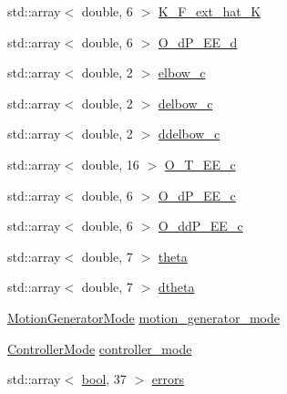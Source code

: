 \begin{DoxyCompactItemize}
\item 
std\+::array$<$ double, 6 $>$ \hyperlink{structresearch__interface_1_1robot_1_1RobotState_a0bde767e50880d3ced2dabe7b464890c}{K\+\_\+\+F\+\_\+ext\+\_\+hat\+\_\+K}
\item 
std\+::array$<$ double, 6 $>$ \hyperlink{structresearch__interface_1_1robot_1_1RobotState_aa8db400627815023275151f75b0dec35}{O\+\_\+d\+P\+\_\+\+E\+E\+\_\+d}
\item 
std\+::array$<$ double, 2 $>$ \hyperlink{structresearch__interface_1_1robot_1_1RobotState_a3ba566919f53e6f254a94d4ce0653989}{elbow\+\_\+c}
\item 
std\+::array$<$ double, 2 $>$ \hyperlink{structresearch__interface_1_1robot_1_1RobotState_a1712aac6d0214ba49004df02294d3620}{delbow\+\_\+c}
\item 
std\+::array$<$ double, 2 $>$ \hyperlink{structresearch__interface_1_1robot_1_1RobotState_abc44c8d00e4988d7238b4cc31c46364f}{ddelbow\+\_\+c}
\item 
std\+::array$<$ double, 16 $>$ \hyperlink{structresearch__interface_1_1robot_1_1RobotState_aad3e61ffb4787a8a227675ee26ab0b8f}{O\+\_\+\+T\+\_\+\+E\+E\+\_\+c}
\item 
std\+::array$<$ double, 6 $>$ \hyperlink{structresearch__interface_1_1robot_1_1RobotState_a79a43551761a4847e2e96385ecb3a5c8}{O\+\_\+d\+P\+\_\+\+E\+E\+\_\+c}
\item 
std\+::array$<$ double, 6 $>$ \hyperlink{structresearch__interface_1_1robot_1_1RobotState_a0ad4e2b778593074b619dd0f24372774}{O\+\_\+dd\+P\+\_\+\+E\+E\+\_\+c}
\item 
std\+::array$<$ double, 7 $>$ \hyperlink{structresearch__interface_1_1robot_1_1RobotState_a7f1eca05ce359a0c4aed4c2525f2edd0}{theta}
\item 
std\+::array$<$ double, 7 $>$ \hyperlink{structresearch__interface_1_1robot_1_1RobotState_ac13d914b6a151e093a2067c134a0d5c0}{dtheta}
\item 
\hyperlink{namespaceresearch__interface_1_1robot_abd2451eb963a1843f1eb066ebd4b06e8}{Motion\+Generator\+Mode} \hyperlink{structresearch__interface_1_1robot_1_1RobotState_acc1b53a916cd01f1ad39924df4487ec4}{motion\+\_\+generator\+\_\+mode}
\item 
\hyperlink{namespaceresearch__interface_1_1robot_a54ee0c8bfefd2ee8a46837ca6d2b1213}{Controller\+Mode} \hyperlink{structresearch__interface_1_1robot_1_1RobotState_a1f198a1ead6a28ed3c0481468597eb53}{controller\+\_\+mode}
\item 
std\+::array$<$ \hyperlink{classbool}{bool}, 37 $>$ \hyperlink{structresearch__interface_1_1robot_1_1RobotState_aee6227a9ca54cfd074844ae0325646b5}{errors}

\end{DoxyCompactItemize}
